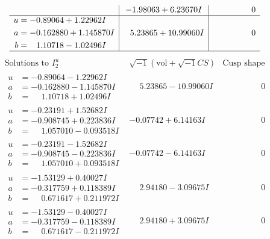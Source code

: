 \documentclass[1p]{elsarticle_modified}
\theoremstyle{definition}
\newcommand{\I}{\sqrt{-1}}
\begin{document}
$$\begin{array}{c|c|c}
 & -1.98063 + 6.23670 I & \phantom{-0.000000 } 0 \\ \hline\begin{aligned}
u &= -0.89064 + 1.22962 I \\
a &= -0.162880 + 1.145870 I \\
b &= \phantom{-}1.10718 - 1.02496 I\end{aligned}
 & \phantom{-}5.23865 + 10.99060 I & \phantom{-0.000000 } 0\\
 \hline 
 \end{array}$$\newpage$$\begin{array}{c|c|c}  
\text{Solutions to }I^u_{2}& \I (\text{vol} + \sqrt{-1}CS) & \text{Cusp shape}\\
 \hline 
\begin{aligned}
u &= -0.89064 - 1.22962 I \\
a &= -0.162880 - 1.145870 I \\
b &= \phantom{-}1.10718 + 1.02496 I\end{aligned}
 & \phantom{-}5.23865 - 10.99060 I & \phantom{-0.000000 } 0 \\ \hline\begin{aligned}
u &= -0.23191 + 1.52682 I \\
a &= -0.908745 + 0.223836 I \\
b &= \phantom{-}1.057010 - 0.093518 I\end{aligned}
 & -0.07742 + 6.14163 I & \phantom{-0.000000 } 0 \\ \hline\begin{aligned}
u &= -0.23191 - 1.52682 I \\
a &= -0.908745 - 0.223836 I \\
b &= \phantom{-}1.057010 + 0.093518 I\end{aligned}
 & -0.07742 - 6.14163 I & \phantom{-0.000000 } 0 \\ \hline\begin{aligned}
u &= -1.53129 + 0.40027 I \\
a &= -0.317759 + 0.118389 I \\
b &= \phantom{-}0.671617 + 0.211972 I\end{aligned}
 & \phantom{-}2.94180 - 3.09675 I & \phantom{-0.000000 } 0 \\ \hline\begin{aligned}
u &= -1.53129 - 0.40027 I \\
a &= -0.317759 - 0.118389 I \\
b &= \phantom{-}0.671617 - 0.211972 I\end{aligned}
 & \phantom{-}2.94180 + 3.09675 I & \phantom{-0.000000 } 0 \\ \hline\begin{aligned}

\end{aligned}
\end{array}$$
\end{document}
